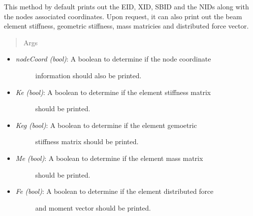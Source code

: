 \documentclass[letterpaper,10pt,english]{sphinxmanual}
\begin{document}
\begin{fulllineitems}
\begin{fulllineitems}
This method by default prints out the EID, XID, SBID and the NIDs along
with the nodes associated coordinates. Upon request, it can also print
out the beam element stiffness, geometric stiffness, mass matricies and
distributed force vector.
\begin{quote}\begin{description}
\item[{Args}] \leavevmode
\end{description}\end{quote}
\begin{itemize}
\item {} \begin{description}
\item[{\emph{nodeCoord (bool)}: A boolean to determine if the node coordinate}] \leavevmode
information should also be printed.

\end{description}

\item {} \begin{description}
\item[{\emph{Ke (bool)}: A boolean to determine if the element stiffness matrix}] \leavevmode
should be printed.

\end{description}

\item {} \begin{description}
\item[{\emph{Keg (bool)}: A boolean to determine if the element gemoetric}] \leavevmode
stiffness matrix should be printed.

\end{description}

\item {} \begin{description}
\item[{\emph{Me (bool)}: A boolean to determine if the element mass matrix}] \leavevmode
should be printed.

\end{description}

\item {} \begin{description}
\item[{\emph{Fe (bool)}: A boolean to determine if the element distributed force}] \leavevmode
and moment vector should be printed.

\end{description}


\end{itemize}
\end{fulllineitems}
\end{fulllineitems}
\end{document}
